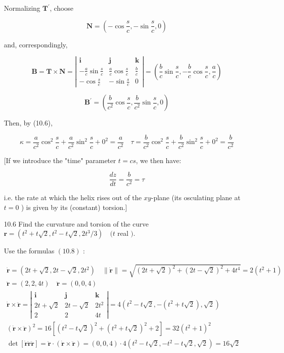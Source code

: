 \documentclass[10pt]{article}
\begin{document}
Normalizing $\mathbf{T}^{\prime}$, choose

$$
\mathbf{N}=\left(-\cos \frac{s}{c},-\sin \frac{s}{c}, 0\right)
$$

and, correspondingly,

$$
\mathbf{B}=\mathbf{T} \times \mathbf{N}=\left|\begin{array}{ccc}
\mathbf{i} & \mathbf{j} & \mathbf{k} \\
-\frac{a}{c} \sin \frac{s}{c} & \frac{a}{c} \cos \frac{s}{c} & \frac{b}{c} \\
-\cos \frac{s}{c} & -\sin \frac{s}{c} & 0
\end{array}\right|=\left(\frac{b}{c} \sin \frac{s}{c},-\frac{b}{c} \cos \frac{s}{c}, \frac{a}{c}\right)
$$

$$
\mathbf{B}^{\prime}=\left(\frac{b}{c^{2}} \cos \frac{s}{c}, \frac{b}{c^{2}} \sin \frac{s}{c}, 0\right)
$$

Then, by (10.6),

$$
\kappa=\frac{a}{c^{2}} \cos ^{2} \frac{s}{c}+\frac{a}{c^{2}} \sin ^{2} \frac{s}{c}+0^{2}=\frac{a}{c^{2}} \quad \tau=\frac{b}{c^{2}} \cos ^{2} \frac{s}{c}+\frac{b}{c^{2}} \sin ^{2} \frac{s}{c}+0^{2}=\frac{b}{c^{2}}
$$

[If we introduce the "time" parameter $t=c s$, we then have:

$$
\frac{d z}{d t}=\frac{b}{c^{2}}=\tau
$$

i.e. the rate at which the helix rises out of the $x y$-plane (its osculating plane at $t=0$ ) is given by its (constant) torsion.]

10.6 Find the curvature and torsion of the curve $\mathbf{r}=\left(t^{2}+t \sqrt{2}, t^{2}-t \sqrt{2}, 2 t^{3} / 3\right) \quad(t$ real $)$.

Use the formulas $(10.8)$ :

$$
\begin{gathered}
\dot{\mathbf{r}}=\left(2 t+\sqrt{2}, 2 t-\sqrt{2}, 2 t^{2}\right) \quad\|\dot{\mathbf{r}}\|=\sqrt{(2 t+\sqrt{2})^{2}+(2 t-\sqrt{2})^{2}+4 t^{4}}=2\left(t^{2}+1\right) \\
\ddot{\mathbf{r}}=(2,2,4 t) \quad \ddot{\mathbf{r}}=(0,0,4) \\
\dot{\mathbf{r}} \times \ddot{\mathbf{r}}=\left|\begin{array}{ccc}
\mathbf{i} & \mathbf{j} & \mathbf{k} \\
2 t+\sqrt{2} & 2 t-\sqrt{2} & 2 t^{2} \\
2 & 2 & 4 t
\end{array}\right|=4\left(t^{2}-t \sqrt{2},-\left(t^{2}+t \sqrt{2}\right), \sqrt{2}\right) \\
(\dot{\mathbf{r}} \times \ddot{\mathbf{r}})^{2}=16\left[\left(t^{2}-t \sqrt{2}\right)^{2}+\left(t^{2}+t \sqrt{2}\right)^{2}+2\right]=32\left(t^{2}+1\right)^{2} \\
\operatorname{det}[\dot{\mathbf{r}} \ddot{\mathbf{r}} \ddot{\mathbf{r}}]=\ddot{\mathbf{r}} \cdot(\dot{\mathbf{r}} \times \ddot{\mathbf{r}})=(0,0,4) \cdot 4\left(t^{2}-t \sqrt{2},-t^{2}-t \sqrt{2}, \sqrt{2}\right)=16 \sqrt{2}
\end{gathered}
$$
\end{document}
